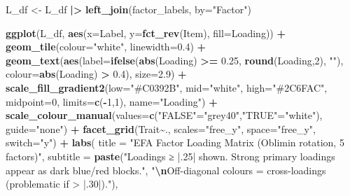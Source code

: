 \documentclass[
]{article}
\newenvironment{Shaded}{\begin{snugshade}}{\end{snugshade}}
\newcommand{\AttributeTok}[1]{\textcolor[rgb]{0.13,0.29,0.53}{#1}}
\newcommand{\DecValTok}[1]{\textcolor[rgb]{0.00,0.00,0.81}{#1}}
\newcommand{\FloatTok}[1]{\textcolor[rgb]{0.00,0.00,0.81}{#1}}
\newcommand{\FunctionTok}[1]{\textcolor[rgb]{0.13,0.29,0.53}{\textbf{#1}}}
\newcommand{\NormalTok}[1]{#1}
\newcommand{\OtherTok}[1]{\textcolor[rgb]{0.56,0.35,0.01}{#1}}
\newcommand{\SpecialCharTok}[1]{\textcolor[rgb]{0.81,0.36,0.00}{\textbf{#1}}}
\newcommand{\StringTok}[1]{\textcolor[rgb]{0.31,0.60,0.02}{#1}}
\newcounter{none} %
\begin{document}
\begin{Shaded}
\begin{Highlighting}[]
\NormalTok{L\_df }\OtherTok{\textless{}{-}}\NormalTok{ L\_df }\SpecialCharTok{|\textgreater{}}
  \FunctionTok{left\_join}\NormalTok{(factor\_labels, }\AttributeTok{by=}\StringTok{"Factor"}\NormalTok{)}

\FunctionTok{ggplot}\NormalTok{(L\_df, }\FunctionTok{aes}\NormalTok{(}\AttributeTok{x=}\NormalTok{Label, }\AttributeTok{y=}\FunctionTok{fct\_rev}\NormalTok{(Item), }\AttributeTok{fill=}\NormalTok{Loading)) }\SpecialCharTok{+}
  \FunctionTok{geom\_tile}\NormalTok{(}\AttributeTok{colour=}\StringTok{"white"}\NormalTok{, }\AttributeTok{linewidth=}\FloatTok{0.4}\NormalTok{) }\SpecialCharTok{+}
  \FunctionTok{geom\_text}\NormalTok{(}\FunctionTok{aes}\NormalTok{(}\AttributeTok{label=}\FunctionTok{ifelse}\NormalTok{(}\FunctionTok{abs}\NormalTok{(Loading) }\SpecialCharTok{\textgreater{}=} \FloatTok{0.25}\NormalTok{, }\FunctionTok{round}\NormalTok{(Loading,}\DecValTok{2}\NormalTok{), }\StringTok{""}\NormalTok{),}
                \AttributeTok{colour=}\FunctionTok{abs}\NormalTok{(Loading) }\SpecialCharTok{\textgreater{}} \FloatTok{0.4}\NormalTok{),}
            \AttributeTok{size=}\FloatTok{2.9}\NormalTok{) }\SpecialCharTok{+}
  \FunctionTok{scale\_fill\_gradient2}\NormalTok{(}\AttributeTok{low=}\StringTok{"\#C0392B"}\NormalTok{, }\AttributeTok{mid=}\StringTok{"white"}\NormalTok{, }\AttributeTok{high=}\StringTok{"\#2C6FAC"}\NormalTok{,}
                       \AttributeTok{midpoint=}\DecValTok{0}\NormalTok{, }\AttributeTok{limits=}\FunctionTok{c}\NormalTok{(}\SpecialCharTok{{-}}\DecValTok{1}\NormalTok{,}\DecValTok{1}\NormalTok{), }\AttributeTok{name=}\StringTok{"Loading"}\NormalTok{) }\SpecialCharTok{+}
  \FunctionTok{scale\_colour\_manual}\NormalTok{(}\AttributeTok{values=}\FunctionTok{c}\NormalTok{(}\StringTok{"FALSE"}\OtherTok{=}\StringTok{"grey40"}\NormalTok{,}\StringTok{"TRUE"}\OtherTok{=}\StringTok{"white"}\NormalTok{), }\AttributeTok{guide=}\StringTok{"none"}\NormalTok{) }\SpecialCharTok{+}
  \FunctionTok{facet\_grid}\NormalTok{(Trait}\SpecialCharTok{\textasciitilde{}}\NormalTok{., }\AttributeTok{scales=}\StringTok{"free\_y"}\NormalTok{, }\AttributeTok{space=}\StringTok{"free\_y"}\NormalTok{, }\AttributeTok{switch=}\StringTok{"y"}\NormalTok{) }\SpecialCharTok{+}
  \FunctionTok{labs}\NormalTok{(}
    \AttributeTok{title    =} \StringTok{"EFA Factor Loading Matrix (Oblimin rotation, 5 factors)"}\NormalTok{,}
    \AttributeTok{subtitle =} \FunctionTok{paste}\NormalTok{(}\StringTok{"Loadings ≥ |.25| shown. Strong primary loadings appear as dark blue/red blocks."}\NormalTok{,}
                     \StringTok{"}\SpecialCharTok{\textbackslash{}n}\StringTok{Off{-}diagonal colours = cross{-}loadings (problematic if \textgreater{} |.30|)."}\NormalTok{),}

\end{Highlighting}
\end{Shaded}
\end{document}
